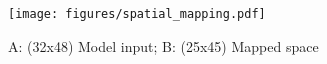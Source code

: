 \begin{figure}[!ht]
    \centering
    \texttt{[image: figures/spatial\_mapping.pdf]}
    \caption{A: (32x48) Model input; B: (25x45) Mapped space}
    \label{fig:spatial_map}
\end{figure}